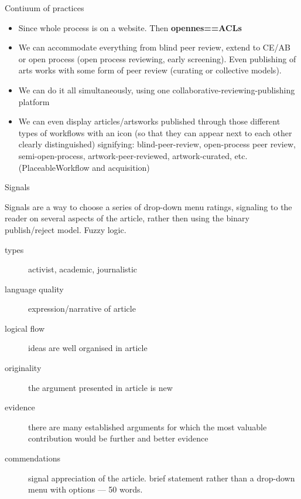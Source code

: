 \begin{frame}{Contiuum of practices}
 
\begin{itemize}
\item Since whole process is on a website. Then {\bf opennes==ACLs}

\item We can accommodate everything from blind peer review, extend to CE/AB or open process (open process reviewing, early screening). 
Even publishing of arts works with some form of peer review (curating or collective models).

\item We can do it all simultaneously, using one collaborative-reviewing-publishing platform

\item We can even display articles/artsworks published through those different types of workflows with an icon (so that they can appear next to each other clearly distinguished) signifying: blind-peer-review, open-process peer review, semi-open-process, artwork-peer-reviewed, artwork-curated, etc. (PlaceableWorkflow and acquisition)
\end{itemize}
\end{frame}

\begin{frame}{Signals}

Signals are a way to choose a series of drop-down menu ratings, signaling to the reader on several aspects of the article, rather then using the binary publish/reject model. Fuzzy logic.

\begin{description}
\item [types] activist, academic, journalistic

\item [language quality] expression/narrative of article 
\item [logical flow] ideas are well organised in article
\item [originality] the argument presented in article is new
\item [evidence] there are many established arguments for which the most valuable contribution would be further and better evidence
\item [commendations] signal appreciation of the article. brief statement rather than a drop-down menu with options --- 50 words.
\end{description}

\end{frame}

